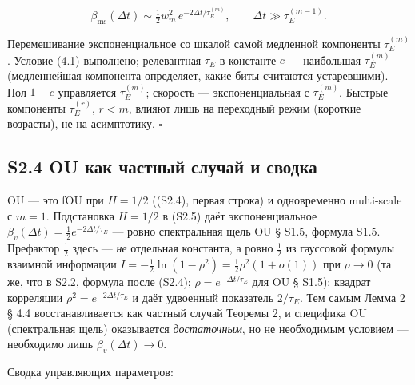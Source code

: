 \documentclass[12pt]{iopart}
\begin{document}
\begin{equation}\beta_{\text{ms}}(\Delta t) \sim \tfrac12 w_m^2\,e^{-2\Delta t/\tau_E^{(m)}}, \qquad \Delta t \gg \tau_E^{(m-1)}. \tag{S2.6}\end{equation}



Перемешивание экспоненциальное со шкалой самой медленной компоненты \(\tau_E^{(m)}\). Условие (4.1) выполнено; релевантная \(\tau_E\) в константе \(c\) --- наибольшая \(\tau_E^{(m)}\) (медленнейшая компонента определяет, какие биты считаются устаревшими). Пол \(1-c\) управляется \(\tau_E^{(m)}\); скорость --- экспоненциальная с \(\tau_E^{(m)}\). Быстрые компоненты \(\tau_E^{(r)}\), \(r < m\), влияют лишь на переходный режим (короткие возрасты), не на асимптотику. \(\square\)



\subsection{S2.4 OU как частный случай и сводка}\label{s2.4-ou-ux43aux430ux43a-ux447ux430ux441ux442ux43dux44bux439-ux441ux43bux443ux447ux430ux439-ux438-ux441ux432ux43eux434ux43aux430}



OU --- это fOU при \(H = 1/2\) ((S2.4), первая строка) и одновременно multi-scale с \(m = 1\). Подстановка \(H = 1/2\) в (S2.5) даёт экспоненциальное \(\beta_v(\Delta t) = \tfrac12 e^{-2\Delta t/\tau_E}\) --- ровно спектральная щель OU \cite{Andriishin2026b} § S1.5, формула S1.5. Префактор \(\tfrac12\) здесь --- \emph{не} отдельная константа, а ровно \(\tfrac12\) из гауссовой формулы взаимной информации \(I = -\tfrac12\ln(1-\rho^2) = \tfrac12\rho^2(1+o(1))\) при \(\rho \to 0\) (та же, что в S2.2, формула после (S2.4); \(\rho = e^{-\Delta t/\tau_E}\) для OU \cite{Andriishin2026b} § S1.5); квадрат корреляции \(\rho^2 = e^{-2\Delta t/\tau_E}\) и даёт удвоенный показатель \(2/\tau_E\). Тем самым Лемма 2 \cite{Andriishin2026b} § 4.4 восстанавливается как частный случай Теоремы 2, и специфика OU (спектральная щель) оказывается \emph{достаточным}, но не необходимым условием --- необходимо лишь \(\beta_v(\Delta t) \to 0\).



Сводка управляющих параметров:
\end{document}
